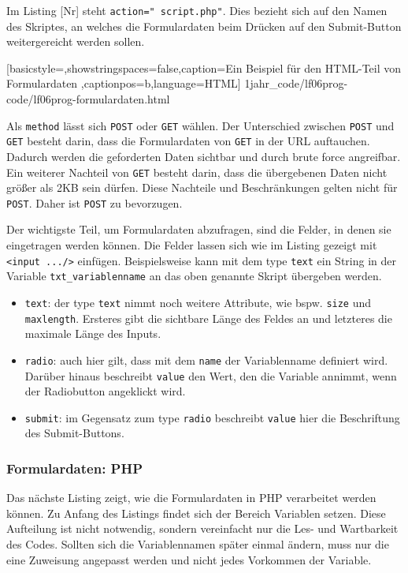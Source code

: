 Im Listing [Nr] steht \texttt{action="\ script.php"}. Dies bezieht sich auf den Namen des Skriptes, an welches die Formulardaten beim Drücken auf den Submit-Button weitergereicht werden sollen.


	[basicstyle=\small,showstringspaces=false,caption={Ein Beispiel für den HTML-Teil von Formulardaten}
	\label{lst:html-formulardaten},captionpos=b,language=HTML]
	{1jahr_code/lf06prog-code/lf06prog-formulardaten.html}

Als \texttt{method} lässt sich \texttt{POST} oder \texttt{GET} wählen. Der Unterschied zwischen \texttt{POST} und \texttt{GET} besteht darin, dass die Formulardaten von \texttt{GET} in der URL auftauchen. Dadurch werden die geforderten Daten sichtbar und durch brute force angreifbar. Ein weiterer Nachteil von \texttt{GET} besteht darin, dass die übergebenen Daten nicht größer als 2KB sein dürfen. Diese Nachteile und Beschränkungen gelten nicht für \texttt{POST}. Daher ist \texttt{POST} zu bevorzugen.

Der wichtigste Teil, um Formulardaten abzufragen, sind die Felder, in denen sie eingetragen werden können. Die Felder lassen sich wie im Listing gezeigt mit \texttt{<input .../>} einfügen. Beispielsweise kann mit dem type \texttt{text} ein String in der Variable \texttt{txt\_variablenname} an das oben genannte Skript übergeben werden.
\begin{itemize}
	\item \texttt{text}: der type \texttt{text} nimmt noch weitere Attribute, wie bspw. \texttt{size} und \texttt{maxlength}. Ersteres gibt die sichtbare Länge des Feldes an und letzteres die maximale Länge des Inputs.
	\item \texttt{radio}: auch hier gilt, dass mit dem \texttt{name} der Variablenname definiert wird. Darüber hinaus beschreibt \texttt{value} den Wert, den die Variable annimmt, wenn der Radiobutton angeklickt wird.
	\item \texttt{submit}: im Gegensatz zum type \texttt{radio} beschreibt \texttt{value} hier die Beschriftung des Submit-Buttons.
\end{itemize} 

\subsubsection{Formulardaten: PHP}

Das nächste Listing zeigt, wie die Formulardaten in PHP verarbeitet werden können. Zu Anfang des Listings findet sich der Bereich \ql Variablen setzen\qr. Diese Aufteilung ist nicht notwendig, sondern vereinfacht nur die Les- und Wartbarkeit des Codes. Sollten sich die Variablennamen später einmal ändern, muss nur die eine Zuweisung angepasst werden und nicht jedes Vorkommen der Variable.

